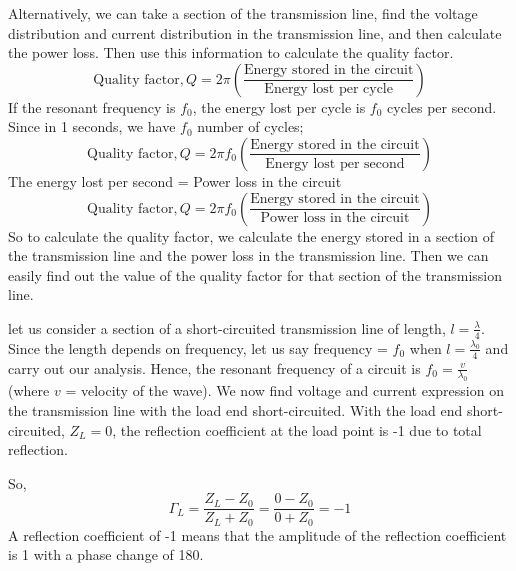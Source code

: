 Alternatively, we can take a section of the transmission line, find the voltage distribution and current distribution in the transmission line, and then calculate the power loss. Then use this information to calculate the quality factor.
\begin{dmath*}
\text{Quality factor},Q 
=2\pi\left(\frac{\text{Energy stored in the circuit}}{\text{Energy lost per cycle}}\right) 
\end{dmath*} 
If the resonant frequency is $ f_0 $, the energy lost per cycle is $ f_0 $ cycles per second. Since in 1 seconds, we have $ f_0 $ number of cycles;
\begin{dmath*}
\text{Quality factor}, Q = 2\pi f_0\left(\frac{\text{Energy stored in the circuit}}{\text{Energy lost per second}}\right)
\end{dmath*}
The energy lost per second = Power loss in the circuit 
\begin{dmath*}
\text{Quality factor}, Q=2 \pi f_0\left(\frac{\text{Energy stored in the circuit}}{\text{Power loss in the circuit}}\right)
\end{dmath*}
So to calculate the quality factor, we calculate the energy stored in a section of the transmission line and the power loss in the transmission line. Then we can easily find out the value of the quality factor for that section of the transmission line.

let us consider a section of a short-circuited transmission line of length, $ l=\frac{\lambda}{4} $. Since the length depends on frequency, let us say frequency = $ f_0 $ when $ l=\frac{\lambda_{0}}{4}$ and carry out our analysis. Hence, the resonant frequency of a circuit is $ f_0 =\frac{v}{\lambda_{0}}$ (where $v$ = velocity of the wave). We now find voltage and current expression on the transmission line with the load end short-circuited. With the load end short-circuited, $Z_{L}= 0$, the reflection coefficient at the load point is -1 due to total reflection.

So,
\[\Gamma_{L} = \frac{Z_{L} - Z_0}{Z_{L} + Z_0} = \frac{0 - Z_0}{0 + Z_0} = -1\]
A reflection coefficient of -1 means that the amplitude of the reflection coefficient is 1 with a phase change of 180\textdegree.

